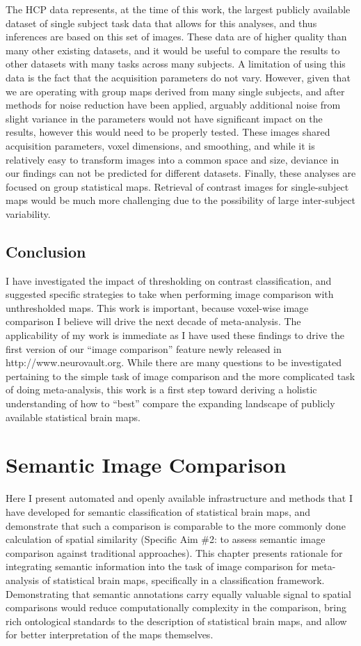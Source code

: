 \documentclass{report}
\begin{document}
The HCP data represents, at the time of this work, the largest publicly
available dataset of single subject task data that allows for this
analyses, and thus inferences are based on this set of images. These
data are of higher quality than many other existing datasets, and it
would be useful to compare the results to other datasets with many tasks
across many subjects. A limitation of using this data is the fact that the acquisition parameters do not vary. However, given that we are operating with group maps derived from many single subjects, and after methods for noise reduction have been applied, arguably additional noise from slight variance in the parameters would not have significant impact on the results, however this would need to be properly tested. These images shared acquisition parameters, voxel
dimensions, and smoothing, and while it is relatively easy to transform
images into a common space and size, deviance in our findings can not
be predicted for different datasets. Finally, these analyses are focused
on group statistical maps. Retrieval of contrast images for
single-subject maps would be much more challenging due to the
possibility of large inter-subject variability.

\section{Conclusion}

I have investigated the impact of thresholding on contrast
classification, and suggested specific strategies to take when
performing image comparison with unthresholded maps. This work is
important, because voxel-wise image comparison I believe will drive the next decade of meta-analysis. The applicability
of my work is immediate as I have used these findings to drive the first
version of our ``image comparison'' feature newly released in
http://www.neurovault.org. While there are many questions to be
investigated pertaining to the simple task of image comparison and the
more complicated task of doing meta-analysis, this work is a first step
toward deriving a holistic understanding of how to ``best'' compare the
expanding landscape of publicly available statistical brain maps.

\chapter{Semantic Image Comparison}
Here I present automated and openly available infrastructure and methods that I have developed for semantic classification of
statistical brain maps, and demonstrate that such a comparison is
comparable to the more commonly done calculation of spatial similarity (Specific Aim \#2: to assess semantic image comparison against traditional
  approaches). This chapter presents rationale for integrating semantic information into the task of image comparison for meta-analysis of statistical brain maps, specifically in a classification
framework. Demonstrating that semantic annotations carry equally valuable signal to spatial comparisons would reduce computationally complexity in the comparison, bring rich ontological standards to the description of statistical brain maps, and allow for better interpretation of the maps themselves.
\end{document}
